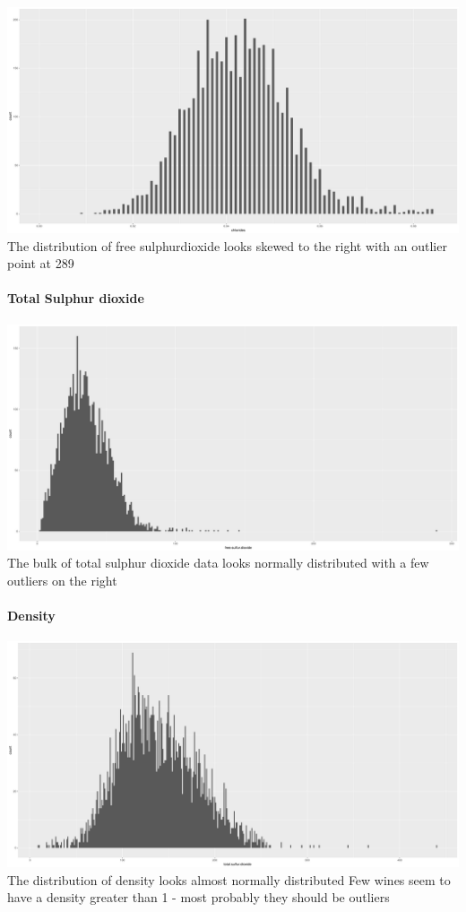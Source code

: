 \documentclass[]{article}
\let\oldparagraph\paragraph
\renewcommand{\paragraph}[1]{\oldparagraph{#1}\mbox{}}
\begin{document}
\includegraphics{White_wine_quality_files/figure-latex/unnamed-chunk-14-1.pdf}
The distribution of free sulphurdioxide looks skewed to the right with
an outlier point at 289

\paragraph{Total Sulphur dioxide}\label{total-sulphur-dioxide}

\includegraphics{White_wine_quality_files/figure-latex/unnamed-chunk-15-1.pdf}
The bulk of total sulphur dioxide data looks normally distributed with a
few outliers on the right

\paragraph{Density}\label{density}

\includegraphics{White_wine_quality_files/figure-latex/unnamed-chunk-16-1.pdf}
The distribution of density looks almost normally distributed Few wines
seem to have a density greater than 1 - most probably they should be
outliers
\end{document}
